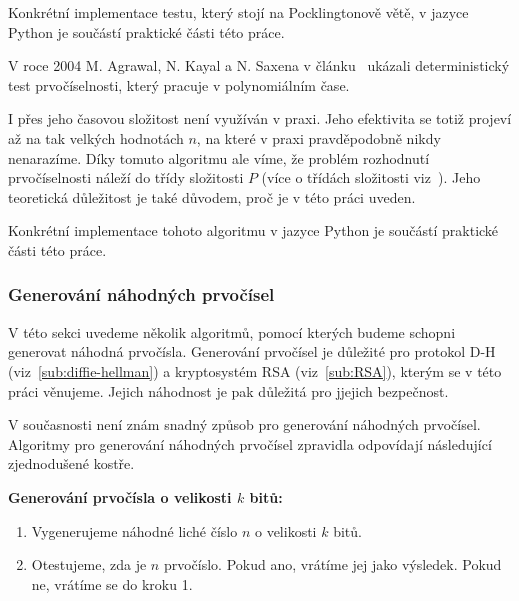 \documentclass[
  program=infoi,
  biblatex=false,
  figures=true,
  glossaries,
  tables=false,
  sourcecodes=true,
  index
]{kidiplom}
\begin{document}
            Konkrétní implementace testu, který stojí na Pocklingtonově větě, v jazyce Python je součástí praktické části této práce.



            V roce 2004 M. Agrawal, N. Kayal a N. Saxena v článku~\cite{primes-in-p} ukázali deterministický test
            prvočíselnosti, který pracuje v polynomiálním čase.

            I přes jeho časovou složitost není využíván v praxi.
            Jeho efektivita se totiž projeví až na tak velkých hodnotách $n$, na které v praxi pravděpodobně nikdy nenarazíme.
            Díky tomuto algoritmu ale víme, že problém rozhodnutí prvočíselnosti náleží do třídy složitosti $P$
            (více o třídách složitosti viz~\cite{complexity}).
            Jeho teoretická důležitost je také důvodem, proč je v této práci uveden.

            Konkrétní implementace tohoto algoritmu v jazyce Python je součástí praktické části této práce.


    \subsubsection{Generování náhodných prvočísel}\label{ss:primes-generation}

        V této sekci uvedeme několik algoritmů, pomocí kterých budeme schopni generovat náhodná prvočísla.
        Generování prvočísel je důležité pro protokol D-H (viz~\ref{sub:diffie-hellman}) a kryptosystém RSA (viz~\ref{sub:RSA}), kterým se
        v této práci věnujeme.
        Jejich náhodnost je pak důležitá pro jjejich bezpečnost.

        V současnosti není znám snadný způsob pro generování náhodných prvočísel.
        Algoritmy pro generování náhodných prvočísel zpravidla odpovídají následující zjednodušené kostře.

        \medskip

        \textbf{Generování prvočísla o velikosti $k$ bitů:}

        \begin{enumerate}
            \item 
                Vygenerujeme náhodné liché číslo $n$ o velikosti $k$ bitů.
            \item 
                Otestujeme, zda je $n$ prvočíslo. Pokud ano, vrátíme jej jako výsledek. Pokud ne, vrátíme se do kroku 1.
        \end{enumerate}
\end{document}
